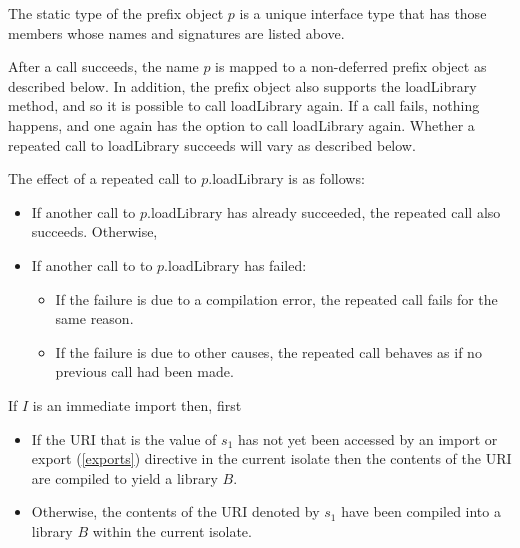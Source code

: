 \documentclass{article}
\newcommand{\code}[1]{{\sf #1}}
\begin{document}
\begin{itemize}

The static type of the prefix object $p$ is a unique interface type that has those members whose names and signatures are listed above.

\LMHash{}
After a call succeeds, the name $p$ is mapped to a non-deferred prefix object as described below. In addition, the prefix object also supports the \code{loadLibrary} method, and so it is possible to call \code{loadLibrary} again. If a call fails, nothing happens, and one again has the option to call \code{loadLibrary} again. Whether a repeated call to \code{loadLibrary} succeeds will vary as described below.

\LMHash{}
The effect of a repeated call to \code{$p$.loadLibrary} is as follows:
\begin{itemize}
\item
If another call to \code{$p$.loadLibrary} has already succeeded, the repeated call also succeeds.
Otherwise,
\item
If another call to  to \code{$p$.loadLibrary} has failed:
\begin{itemize}
\item
If the failure is due to a compilation error, the repeated call fails for the same reason.
\item
If the failure is due to other causes, the repeated call behaves as if no previous call had been made.
\end{itemize}
\end{itemize}


\LMHash{}
If $I$ is an immediate import then, first

 \begin{itemize}
 \item
If  the URI that is the value of $s_1$ has not yet been accessed by an import or export (\ref{exports}) directive  in the current isolate then the contents of the URI  are compiled to yield a library $B$. 
\item Otherwise, the contents of the URI denoted by $s_1$ have been compiled into a library $B$ within the current isolate.
\end{itemize}



\end{itemize}
\end{document}
